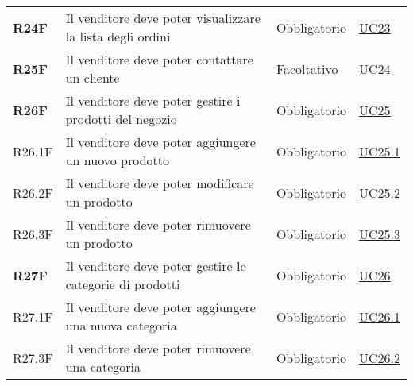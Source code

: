 \begin{center}
\begin{longtable}[!h]{p{50px} p{245px} p{75px} p{50px}}
        \textbf{R24F}                         & Il venditore deve poter visualizzare la lista degli ordini                                                                                             & Obbligatorio             & \hyperref[sec:UC23]{UC23}                    \\
        \textbf{R25F}                         & Il venditore deve poter contattare un cliente                                                                                                          & Facoltativo              & \hyperref[sec:UC24]{UC24}                    \\
        \textbf{R26F}                         & Il venditore deve poter gestire i prodotti del negozio                                                                                                 & Obbligatorio             & \hyperref[sec:UC25]{UC25}                    \\
        R26.1F                                & Il venditore deve poter aggiungere un nuovo prodotto                                                                                                   & Obbligatorio             & \hyperref[sec:UC25.1]{UC25.1}                \\
        R26.2F                                & Il venditore deve poter modificare un prodotto                                                                                                         & Obbligatorio             & \hyperref[sec:UC25.2]{UC25.2}                \\
        R26.3F                                & Il venditore deve poter rimuovere un prodotto                                                                                                          & Obbligatorio             & \hyperref[sec:UC25.3]{UC25.3}                \\
        \textbf{R27F}                         & Il venditore deve poter gestire le categorie di prodotti                                                                                               & Obbligatorio             & \hyperref[sec:UC26]{UC26}                    \\
        R27.1F                                & Il venditore deve poter aggiungere una nuova categoria                                                                                                 & Obbligatorio             & \hyperref[sec:UC26.1]{UC26.1}                \\
        R27.3F                                & Il venditore deve poter rimuovere una categoria                                                                                                        & Obbligatorio             & \hyperref[sec:UC26.2]{UC26.2}                \\

\end{longtable}
\end{center}
